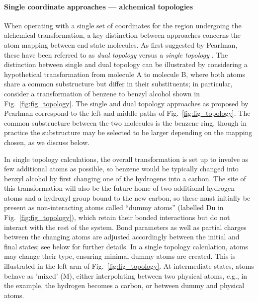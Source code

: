 \documentclass[9pt,bestpractices]{livecoms}
\newcommand{\sbnote}[1]{%
  {\bfseries{}[SB: }%
  {\textcolor{blue}{#1}}{\bfseries{}]}
}
\begin{document}
\paragraph{Single coordinate approaches --- alchemical topologies}

When operating with a single set of coordinates for the region undergoing the alchemical transformation, a key distinction between approaches concerns the atom mapping between end state molecules. %
As first suggested by Pearlman, these have been referred to as \emph{dual topology} versus a \emph{single topology} \cite{Pearlman_1994}. The distinction between single and dual topology can be illustrated by considering a hypothetical transformation from molecule A to molecule B, where both atoms share a common substructure but differ in their substituents; in particular, consider a transformation of benzene to benzyl alcohol shown in Fig.~\ref{fig:fig_topology}. The single and dual topology approaches as proposed by Pearlman correspond to the left and middle paths of Fig.~\ref{fig:fig_topology}.  %
The common substructure between the two molecules is the benzene ring, though in practice the substructure may be selected to be larger depending on the mapping chosen, as we discuss below.

In single topology calculations, the overall transformation is set up to involve as few additional atoms as possible, so benzene would be typically changed into benzyl alcohol by first changing one of the hydrogens into a carbon. The site of this transformation will also be the future home of two additional hydrogen atoms and a hydroxyl group bound to the new carbon, so these must initially be present as non-interacting atoms called ``dummy atoms'' (labelled Du in Fig.~\ref{fig:fig_topology}), which retain their bonded interactions but do not interact with the rest of the system.  Bond parameters as well as partial charges between the changing atoms are adjusted accordingly between the initial and final states; see below for further details. In a single topology calculation, atoms may change their type, ensuring minimal dummy atoms are created. This is illustrated in the left arm of Fig.~\ref{fig:fig_topology}. At intermediate states, atoms behave as 'mixed' (M), either interpolating between two physical atoms, e.g., in the example, the hydrogen becomes a carbon, or between dummy and physical atoms.
\end{document}
